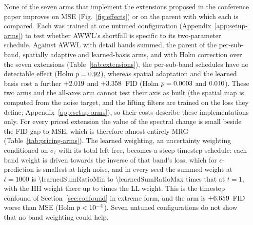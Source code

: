 None of the seven arms that implement the extensions proposed in the
conference paper improves on MSE (Fig.~\ref{fig:effects}) or on the parent
with which each is compared. Each was trained at one untuned configuration
(Appendix~\ref{app:setup-arms}) to test whether AWWL's shortfall is specific
to its two-parameter schedule. Against AWWL with detail bands summed, the
parent of the per-sub-band, spatially adaptive and learned-basis arms, and
with Holm correction over the seven extensions
(Table~\ref{tab:extensions}), the per-sub-band schedules have no detectable
effect (Holm $p = 0.92$), whereas spatial adaptation and the
learned basis cost a further $+2.019$ and $+3.358$~FID
(Holm $p = 0.0003$ and $0.010$). These two
arms and the all-axes arm cannot test their axis as built (the spatial map
is computed from the noise target, and the lifting filters are trained on
the loss they define; Appendix~\ref{app:setup-arms}), so their costs
describe these implementations only. For every priced extension the value of the spectral change is small beside the FID gap to
MSE, which is therefore almost entirely MRG (Table~\ref{tab:pricing-arms}).
The learned weighting, an uncertainty weighting \citep{kendall2018multi}
conditioned on $\sigma_t$ with its total left free, becomes a steep timestep
schedule: each band weight is driven towards the inverse of that band's loss,
which for $\epsilon$-prediction is smallest at high noise, and in every
seed the summed weight at $t = 1000$ is \num{\learnedSumRatioMin} to
\num{\learnedSumRatioMax} times that at $t = 1$,
with the HH weight there up to \learnedHHLLMax{} times the LL weight. This is
the timestep confound of Section~\ref{sec:confound} in extreme form, and the
arm is $+6.659$~FID worse than MSE (Holm $p <10^{-4}$). Seven
untuned configurations do not show that no band weighting could help.
